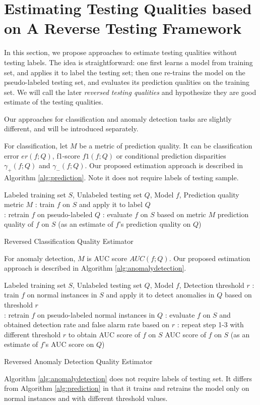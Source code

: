 \section{Estimating Testing Qualities based on A 
Reverse Testing Framework} 

In this section, we propose approaches to estimate 
testing qualities without testing labels. 
The idea is straightforward: one first learns a model 
from training set, and applies it to label the testing 
set; then one re-trains the model on the pseudo-labeled 
testing set, and evaluates its prediction qualities on 
the training set. We will call the later 
\textit{reversed testing qualities} and hypothesize 
they are good estimate of the testing qualities. 

Our approaches for classification and anomaly detection 
tasks are slightly different, and will be introduced 
separately. 

For classification, let $M$ be a metric of prediction 
quality. It can be classification error $er(f; Q)$, 
f1-score $f1(f; Q)$ or conditional prediction 
disparities $\gamma_{+}(f; Q)$ and $\gamma_{-}(f; Q)$. 
Our proposed estimation approach is described in 
Algorithm \ref{alg:prediction}. Note it does not require 
labels of testing sample. 

\begin{algorithm}[h]
\begin{algorithmic}
    Labeled training set $S$, 
   Unlabeled testing set $Q$, Model $f$, 
   Prediction quality metric $M$
   : train $f$ on $S$ and apply it to label $Q$ \\   
   : retrain $f$ on pseudo-labeled $Q$ 
   : evaluate $f$ on $S$ based on metric $M$
    prediction quality 
   of $f$ on $S$ (as an estimate of $f$'s prediction 
   quality on $Q$)  
   \vskip -0.2in
\end{algorithmic}
   \caption{Reversed Classification Quality Estimator}
\label{alg:prediction}
\end{algorithm}

For anomaly detection, $M$ is AUC score $AUC(f; Q)$. 
Our proposed estimation approach is described in 
Algorithm \ref{alg:anomalydetection}. 

\begin{algorithm}[h]
\begin{algorithmic}
    Labeled training set $S$, 
   Unlabeled testing set $Q$, Model $f$, Detection 
   threshold $r$  
   : train $f$ on {normal instances} in $S$ 
   and apply  it to detect anomalies in $Q$ based on 
   threshold $r$ \\   
   : retrain $f$ on pseudo-labeled normal instances 
   in $Q$ 
   : evaluate $f$ on $S$ and obtained detection 
   rate and false alarm rate based on $r$ 
   : repeat step 1-3 with different threshold 
   $r$ to obtain AUC score of $f$ on $S$ 
    AUC score of $f$ on $S$
    (as an estimate of $f$'s AUC score on $Q$)
   \vskip -0.2in
\end{algorithmic}
   \caption{Reversed Anomaly Detection Quality Estimator}
\label{alg:anomalydetection}
\end{algorithm}

Algorithm \ref{alg:anomalydetection} does not require labels of 
testing set. It differs from Algorithm \ref{alg:prediction} 
in that it trains and retrains the model only on normal 
instances and with different threshold values. 